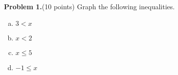 \documentclass[12pt]{article}
\date{January 14, 2015}
\begin{document}
\bigskip

\vspace{.5in}

{\bf Problem 1.}(10 points)  Graph the following inequalities.
\begin{enumerate}[(a)]
\item
  $3 < x$
  \vspace{1.5in}
\item
  $x < 2$
  \vspace{1.5in}
\item
  $x \leq 5$
  \vspace{1.5in}
\item
  $-1 \leq x$
\end{enumerate}
\end{document}

